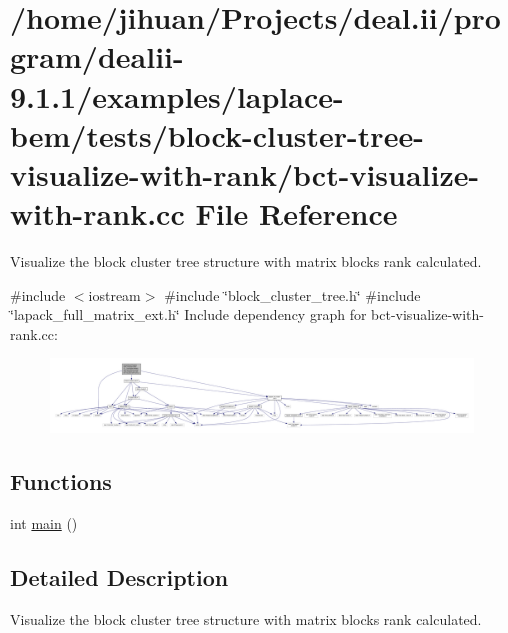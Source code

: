 \hypertarget{bct-visualize-with-rank_8cc}{}\section{/home/jihuan/\+Projects/deal.ii/program/dealii-\/9.1.1/examples/laplace-\/bem/tests/block-\/cluster-\/tree-\/visualize-\/with-\/rank/bct-\/visualize-\/with-\/rank.cc File Reference}
\label{bct-visualize-with-rank_8cc}


Visualize the block cluster tree structure with matrix block\textquotesingle{}s rank calculated.  


{\ttfamily \#include $<$iostream$>$}\newline
{\ttfamily \#include \char`\"{}block\+\_\+cluster\+\_\+tree.\+h\char`\"{}}\newline
{\ttfamily \#include \char`\"{}lapack\+\_\+full\+\_\+matrix\+\_\+ext.\+h\char`\"{}}\newline
Include dependency graph for bct-\/visualize-\/with-\/rank.cc\+:
\nopagebreak
\begin{figure}[H]
\begin{center}
\leavevmode
\includegraphics[width=350pt]{bct-visualize-with-rank_8cc__incl}
\end{center}
\end{figure}
\subsection*{Functions}
\begin{DoxyCompactItemize}
\item 
int \hyperlink{bct-visualize-with-rank_8cc_ae66f6b31b5ad750f1fe042a706a4e3d4}{main} ()
\end{DoxyCompactItemize}


\subsection{Detailed Description}
Visualize the block cluster tree structure with matrix block\textquotesingle{}s rank calculated. 

